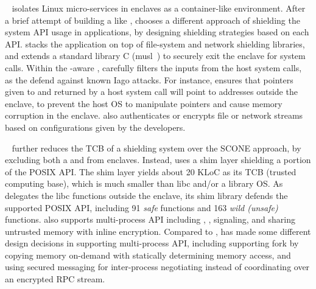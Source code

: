 \scone{}~\cite{osdi16scone} isolates Linux micro-services in enclaves as a container-like environment.
After a brief attempt of building a \libos{} like \haven{},
\scone{} chooses a different approach of shielding the system API usage in applications, by designing shielding strategies based on each API.
\scone{} stacks the application on top of file-system and network shielding libraries, and extends a standard library C (musl~\cite{musl}) to securely exit the enclave for system calls.
Within the \sgx{}-aware \libc{}, \scone{} carefully filters the inputs from the host system calls, as the defend against known Iago attacks.
For instance, \scone{} ensures that pointers given to and returned by a host system call will point to addresses outside the enclave,
to prevent the host OS to manipulate pointers and cause memory corruption in the enclave.
\scone{} also authenticates or encrypts file or network streams
based on configurations given by the developers.



\panoply{}~\cite{shinde17panoply} further reduces the TCB of a shielding system over the SCONE approach, by excluding both a \libos{} and \libc{} from enclaves.
Instead, \panoply{} uses a shim layer shielding a portion of the POSIX API. The shim layer yields about 20 KLoC as its TCB (trusted computing base), which is much smaller than libc and/or a library OS.
As \panoply{} delegates the libc functions outside the enclave, its shim library defends the supported POSIX API,
including 91 {\em safe} functions and 163 {\em wild (unsafe)} functions.
\panoply{} also supports multi-process API including , , signaling, and sharing untrusted memory with inline encryption.
Compared to \graphenesgx{}, \panoply{} has made some different design decisions in supporting multi-process API,
including supporting fork by copying memory on-demand with statically determining memory access,
and using secured messaging for inter-process negotiating instead of coordinating over an encrypted RPC stream.


